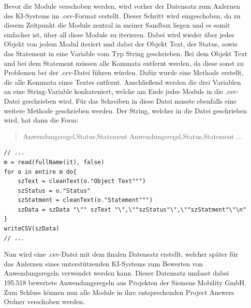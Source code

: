 Bevor die Module verschoben werden, wird vorher der Datensatz zum Anlernen des KI-Systems im .csv-Format erstellt. Dieser
Schritt wird eingeschoben, da zu diesem Zeitpunkt die Module zentral in meiner Sandbox liegen und es somit einfacher ist, über all diese Module zu iterieren. Dabei wird wieder über jedes Objekt
von jedem Modul iteriert und dabei der Objekt Text, der Status, sowie das Statement in eine Variable vom Typ String geschrieben. Bei dem Objekt Text und bei dem Statement müssen alle Kommata entfernt
werden, da diese sonst zu Problemen bei der .csv-Datei führen würden. Dafür wurde eine Methode erstellt, die alle Kommata eines Textes entfernt. Anschließend werden die drei Variablen an eine
String-Variable konkateniert, welche am Ende jedes Moduls in die .csv-Datei geschrieben wird. Für das Schreiben in diese Datei musste ebenfalls eine weitere Methode geschrieben werden. 
Der String, welcher in die Datei geschrieben wird, hat dann die Form:

\begin{quotation}
    \noindent
    \dq Anwendungsregel\dq,\dq Status\dq,\dq Statement\dq \linebreak
    \dq Anwendungsregel\dq,\dq Status\dq,\dq Statement\dq \linebreak
    ...
\end{quotation}

\begin{lstlisting}[caption={Daten in eine .csv-Datei schreiben}, captionpos=b, label = lst:writeCSV]
// ...
m = read(fullName(it), false)
for o in entire m do{
    szText = cleanText(o."Object Text""")
    szStatus = o."Status"
    szStatment = cleanText(o."Statement""")
    szData = szData "\"" szText "\",\""szStatus"\",\""szStatment"\"\n"
}
writeCSV(szData)
// ...
\end{lstlisting}

Nun wird eine .csv-Datei mit dem finalen Datensatz erstellt, welcher später für das Anlernen eines unterstützenden KI-Systems zum Bewerten von Anwendungsregeln verwendet werden kann.
Dieser Datensatz umfasst dabei 195.518 bewertete Anwendungsregeln aus Projekten der Siemens Mobility GmbH. Zum Schluss können nun alle Module in ihre entsprechenden Project Answers Ordner 
verschoben werden. 
